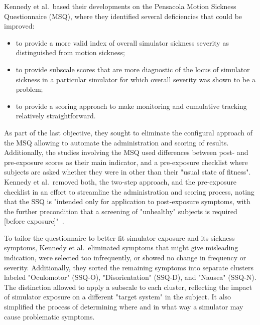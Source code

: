 Kennedy et al.\ based their developments on the Pensacola Motion Sickness Questionnaire (MSQ), where they identified
several deficiencies that could be improved:
\begin{itemize}
    \item to provide a more valid index of overall simulator sickness severity as distinguished from motion sickness;
    \item to provide subscale scores that are more diagnostic of the locus of simulator sickness in a particular
    simulator for which overall severity was shown to be a problem;
    \item to provide a scoring approach to make monitoring and cumulative tracking relatively straightforward.
\end{itemize}
As part of the last objective, they sought to eliminate the configural approach of the MSQ allowing to automate the
administration and scoring of results.
Additionally, the studies involving the MSQ used differences between post- and pre-exposure scores as their main
indicator, and a pre-exposure checklist where subjects are asked whether they were in other than their "usual state 
of fitness".
Kennedy et al.\ removed both, the two-step approach, and the pre-exposure checklist in an effort to streamline the
administration and scoring process, noting that the SSQ is "intended only for application to post-exposure symptoms,
with the further precondition that a screening of "unhealthy" subjects is required [before exposure]"~\cite[p.
207]{Kennedy1993}.

To tailor the questionnaire to better fit simulator exposure and its sickness symptoms, Kennedy et al.\ eliminated
symptoms that might give misleading indication, were selected too infrequently, or showed no change in frequency or
severity.
Additionally, they sorted the remaining symptoms into separate clusters labeled "Oculomotor" (SSQ-O),
"Disorientation" (SSQ-D), and "Nausea" (SSQ-N).
The distinction allowed to apply a subscale to each cluster, reflecting the impact of simulator exposure on a
different "target system" in the subject.
It also simplified the process of determining where and in what way a simulator may cause problematic
symptoms.

